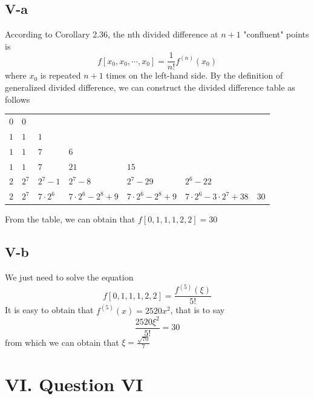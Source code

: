 \documentclass[a4paper]{article}
\begin{document}
\subsection*{V-a}
According to Corollary 2.36, the nth divided difference at $n+1$ "confluent" points is 
\begin{equation}
  f[x_0,x_0,\cdots,x_0]=\frac{1}{n!}f^{(n)}(x_0)
\end{equation}
where $x_0$ is repeated $n+1$ times on the left-hand side.
By the definition of generalized divided difference, we can construct the divided difference table as follows

\begin{table}[H]
\centering
  \begin{tabular}{l|llllll}
  $0$ & $0$   &              &                   &                    &                            &      \\
  $1$ & $1$   & $1$          &                   &                    &                            &      \\
  $1$ & $1$   & $7$          & $6$               &                    &                            &      \\
  $1$ & $1$   & $7$          & $21$              & $15$               &                            &      \\
  $2$ & $2^7$ & $2^7-1$      & $2^7-8$           & $2^7-29$           & $2^6-22$                   &      \\
  $2$ & $2^7$ & $7\cdot 2^6$ & $7\cdot 2^6-2^8+9$ & $7\cdot 2^6-2^8+9$ & $7\cdot 2^6-3\cdot 2^7+38$ & $30$
  \end{tabular}
\end{table}

\noindent From the table, we can obtain that $f[0,1,1,1,2,2]=30$

\subsection*{V-b}
We just need to solve the equation
\begin{equation}
  f[0,1,1,1,2,2]=\frac{f^{(5)}(\xi)}{5!}
\end{equation}
It is easy to obtain that $f^{(5)}(x)=2520x^2$, that is to say
\begin{equation}
  \frac{2520\xi^2}{5!}=30
\end{equation}
from which we can obtain that $\xi=\frac{\sqrt{70}}{7}$

\section*{VI. Question VI}
\end{document}
